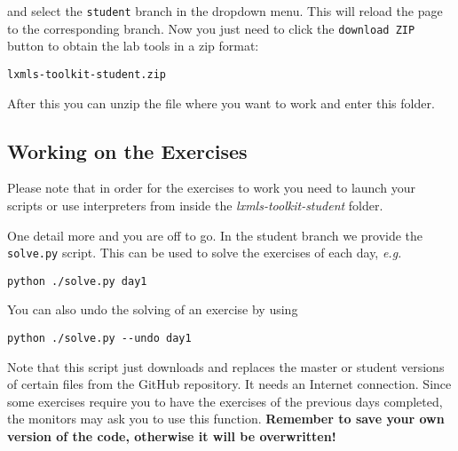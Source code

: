 \noindent and select the \verb+student+ branch in the dropdown menu. This will reload the page to the corresponding branch. Now you just need to click the \verb+download ZIP+ button to obtain the lab tools in a zip format:

\begin{verbatim}
lxmls-toolkit-student.zip
\end{verbatim}

After this you can unzip the file where you want to work and enter this folder.

\subsection{Working on the Exercises}

Please note that in order for the exercises to work you need to launch your scripts or use interpreters from inside the  \textit{lxmls-toolkit-student} folder.

One detail more and you are off to go. In the student branch we provide the \verb+solve.py+ script. This can be used to solve the exercises of each day, \emph{e.g.}
%
\begin{verbatim}
python ./solve.py day1
\end{verbatim}

\noindent You can also undo the solving of an exercise by using

\begin{verbatim}
python ./solve.py --undo day1
\end{verbatim}

Note that this script just downloads and replaces the master or student versions of certain files from the GitHub repository. It needs an Internet connection. Since some exercises require you to have the exercises of the previous days completed, the monitors may ask you to use this function. \textbf{Remember to save your own version of the code, otherwise it will be overwritten!}


